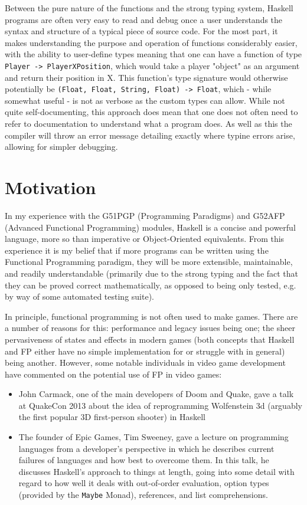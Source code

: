 \documentclass[12pt, a4paper]{report}
\begin{document}
\par

Between the pure nature of the functions and the strong typing system, Haskell programs are often very easy to read and debug once a user understands the syntax and structure of a typical piece of source code.
For the most part, it makes understanding the purpose and operation of functions considerably easier, with the ability to user-define types meaning that one can have a function of type \verb|Player -> PlayerXPosition|, which would take a player "object" as an argument and return their position in X.
This function's type signature would otherwise potentially be \verb|(Float, Float, String, Float) -> Float|, which - while somewhat useful - is not as verbose as the custom types can allow.
While not quite self-documenting, this approach does mean that one does not often need to refer to documentation to understand what a program does.
As well as this the compiler will throw an error message detailing exactly where typine errors arise, allowing for simpler debugging.

\section{Motivation}
In my experience with the G51PGP (Programming Paradigms) and G52AFP (Advanced Functional Programming) modules, Haskell is a concise and powerful language, more so than imperative or Object-Oriented equivalents.
From this experience it is my belief that if more programs can be written using the Functional Programming paradigm, they will be more extensible, maintainable, and readily understandable (primarily due to the strong typing and the fact that they can be proved correct mathematically, as opposed to being only tested, e.g. by way of some automated testing suite).

\par

In principle, functional programming is not often used to make games.
There are a number of reasons for this: performance and legacy issues being one; the sheer pervasiveness of states and effects in modern games (both concepts that Haskell and FP either have no simple implementation for or struggle with in general) being another.
However, some notable individuals in video game development have commented on the potential use of FP in video games:
\begin{itemize}
  \item John Carmack, one of the main developers of Doom and Quake, gave a talk at QuakeCon 2013 about the idea of reprogramming Wolfenstein 3d (arguably the first popular 3D first-person shooter) in Haskell\cite{carmackspeech}
  \item The founder of Epic Games, Tim Sweeney, gave a lecture on programming languages from a developer's perspective in which he describes current failures of languages and how best to overcome them.
    In this talk, he discusses Haskell's approach to things at length, going into some detail with regard to how well it deals with out-of-order evaluation, option types (provided by the \verb|Maybe| Monad), references, and list comprehensions\cite{sweeneytalk}.
\end{itemize}
\end{document}
